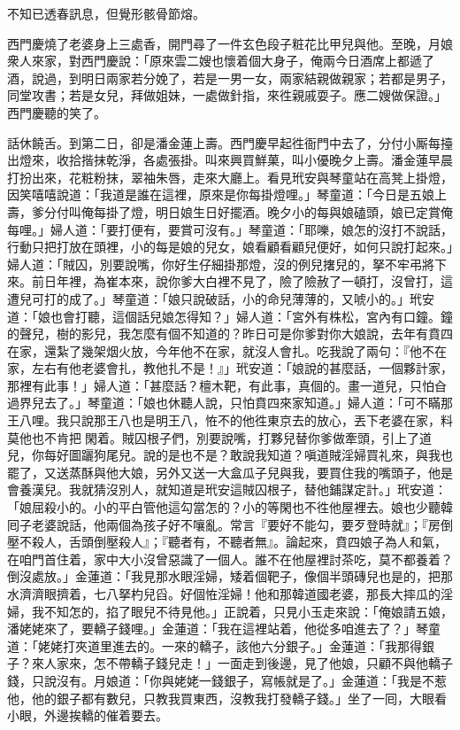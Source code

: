 不知已透春訊息，但覺形骸骨節熔。

西門慶燒了老婆身上三處香，開門尋了一件玄色段子粧花比甲兒與他。至晚，月娘衆人來家，對西門慶說：「原來雲二嫂也懷着個大身子，俺兩今日酒席上都遞了酒，說過，到明日兩家若分娩了，若是一男一女，兩家結親做親家；若都是男子，同堂攻書；若是女兒，拜做姐妹，一處做針指，來徃親戚耍子。應二嫂做保證。」西門慶聽的笑了。

話休饒舌。到第二日，卻是潘金蓮上壽。西門慶早起徃衙門中去了，分付小厮每擡出燈來，收拾揩抹乾淨，各處張掛。叫來興買鮮菓，叫小優晚夕上壽。潘金蓮早晨打扮出來，花粧粉抹，翠袖朱唇，走來大廳上。看見玳安與琴童站在高凳上掛燈，因笑嘻嘻說道：「我道是誰在這裡，原來是你每掛燈哩。」琴童道：「今日是五娘上壽，爹分付叫俺每掛了燈，明日娘生日好擺酒。晚夕小的每與娘磕頭，娘已定賞俺每哩。」婦人道：「要打便有，要賞可沒有。」琴童道：「耶嚛，娘怎的沒打不說話，行動只把打放在頭裡，小的每是娘的兒女，娘看顧看顧兒便好，如何只說打起來。」婦人道：「賊囚，別要說嘴，你好生仔細掛那燈，沒的例兒撦兒的，拏不牢弔將下來。前日年裡，為崔本來，說你爹大白裡不見了，險了險赦了一頓打，沒曾打，這遭兒可打的成了。」琴童道：「娘只說破話，小的命兒薄薄的，又唬小的。」{}玳安道：「娘也會打聽，這個話兒娘怎得知？」婦人道：「宮外有株松，宮內有口鐘。鐘的聲兒，樹的影兒，我怎麼有個不知道的？昨日可是你爹對你大娘說，去年有賁四在家，還紮了幾架烟火放，今年他不在家，就沒人會扎。吃我說了兩句：『他不在家，左右有他老婆會扎，教他扎不是！』」{}玳安道：「娘說的甚麼話，一個夥計家，那裡有此事！」婦人道：「甚麼話？檀木靶，有此事，真個的。畫一道兒，只怕㒲過界兒去了。」琴童道：「娘也休聽人說，只怕賁四來家知道。」婦人道：「可不瞞那王八哩。我只說那王八也是明王八，恠不的他徃東京去的放心，丟下老婆在家，料莫他也不肯把𣭈閑着。賊囚根子們，別要說嘴，打夥兒替你爹做牽頭，引上了道兒，你每好圖躧狗尾兒。說的是也不是？敢說我知道？嗔道賊淫婦買礼來，與我也罷了，又送蒸酥與他大娘，另外又送一大盒瓜子兒與我，要買住我的嘴頭子，他是會養漢兒。我就猜沒別人，就知道是玳安這賊囚根子，替他鋪謀定計。」玳安道：「娘屈殺小的。小的平白管他這勾當怎的？小的等閑也不徃他屋裡去。娘也少聽韓囘子老婆說話，他兩個為孩子好不嚷亂。常言『要好不能勾，要歹登時就』；『房倒壓不殺人，舌頭倒壓殺人』；『聽者有，不聽者無』。論起來，賁四娘子為人和氣，在咱門首住着，家中大小沒曾惡識了一個人。誰不在他屋裡討茶吃，莫不都養着？倒沒處放。」金蓮道：「我見那水眼淫婦，矮着個靶子，像個半頭磚兒也是的，把那水濟濟眼擠着，七八拏杓兒舀。好個恠淫婦！他和那韓道國老婆，那長大摔瓜的淫婦，我不知怎的，掐了眼兒不待見他。」{}正說着，只見小玉走來說：「俺娘請五娘，潘姥姥來了，要轎子錢哩。」金蓮道：「我在這裡站着，他從多咱進去了？」琴童道：「姥姥打夾道里進去的。一來的轎子，該他六分銀子。」金蓮道：「我那得銀子？來人家來，怎不帶轎子錢兒走！」一面走到後邊，見了他娘，只顧不與他轎子錢，只說沒有。{}月娘道：「你與姥姥一錢銀子，寫帳就是了。」金蓮道：「我是不惹他，他的銀子都有數兒，只教我買東西，沒教我打發轎子錢。」坐了一囘，大眼看小眼，外邊挨轎的催着要去。


